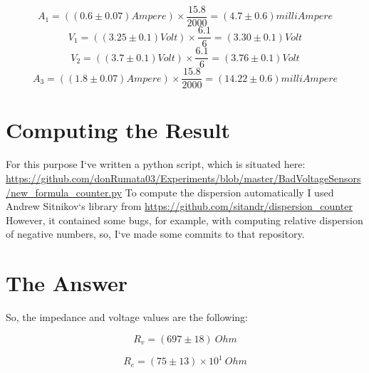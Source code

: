 \documentclass[12pt]{memoir}
\begin{document}
    \begin{equation*}
        A_1 = \left( \left(0.6 \pm 0.07 \right) Ampere \right) \times \frac{15.8}{2000} = \left(4.7 \pm 0.6 \right) milliAmpere
    \end{equation*}
    \begin{equation*}
        V_1 = \left( \left(3.25 \pm 0.1 \right) Volt \right) \times \frac{6.1}{6} = \left(3.30 \pm 0.1 \right) Volt
    \end{equation*}
    \begin{equation*}
        V_2 = \left( \left(3.7 \pm 0.1 \right) Volt \right) \times \frac{6.1}{6} = \left(3.76 \pm 0.1 \right) Volt
    \end{equation*}
    \begin{equation*}
        A_3 = \left( \left(1.8 \pm 0.07 \right) Ampere \right) \times \frac{15.8}{2000} = \left(14.22 \pm 0.6 \right) milliAmpere
    \end{equation*}

    \section {Computing the Result}\label{sec:computing-the-result}
    For this purpose I`ve written a python script, which is situated here: \newline
    \url{https://github.com/donRumata03/Experiments/blob/master/BadVoltageSensors/new_formula_counter.py} \newline
    To compute the dispersion automatically I used Andrew Sitnikov`s library from \url{https://github.com/sitandr/dispersion_counter} \newline
    However, it contained some bugs, for example, with computing relative dispersion of negative numbers, so, I`ve made some commits to that repository.


    \section{The Answer}\label{sec:answer}
    So, the impedance and voltage values are the following:

    \begin{equation*}
        R_v = (697 \pm 18) ~Ohm
    \end{equation*}
    
    \begin{equation*}
        R_e = (75 \pm 13) \times 10^1 ~Ohm
    \end{equation*}
\end{document}
